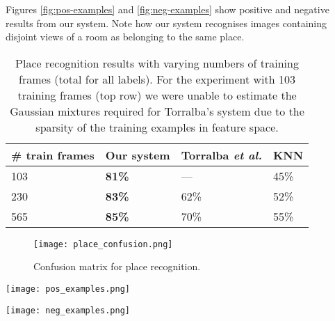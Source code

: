 Figures \ref{fig:pos-examples} and \ref{fig:neg-examples} show
positive and negative results from our system. Note how our system
recognises images containing disjoint views of a room as belonging to
the same place.

\begin{table}[htb]
\centering
\begin{tabular}{ l || l | l | l }
\# train frames & Our system & Torralba {\em et al.} & KNN \\
\hline			
  103 & \textbf{81\%} & --- & 45\% \\
  230 & \textbf{83\%} & 62\% & 52\% \\
  565 & \textbf{85\%} & 70\% & 55\% \\
\end{tabular}
\caption{Place recognition results with varying numbers of training
  frames (total for all labels). For the experiment with 103 training
  frames (top row) we were unable to estimate the Gaussian mixtures
  required for Torralba's system due to the sparsity of the training
  examples in feature space.}
\label{table:place-cla-results}
\end{table}

\begin{figure}[htp]
\centering
\texttt{[image: place\_confusion.png]}
\caption{Confusion matrix for place recognition.}
\label{fig:place-confusion}
\end{figure}

\begin{figure*}[htp]
\centering
\texttt{[image: pos\_examples.png]}
\caption{Example frames for which our classifier succeeded. The ground
  truth label is underlined and the output from our system is
  starred. We show the log likelihoods not the actual posterior
  because the large number of terms in \eqref{lik} causes the
  posterior to always be sharply peaked and hence the log likelihood
  is more informative for visualisation. Note the variation between
  frames with the same label, and the poverty of the information
  contained in many frames.}
\label{fig:pos-examples}
\end{figure*}

\begin{figure*}[htp]
\centering
\texttt{[image: neg\_examples.png]}
\caption{Example frames for which our classifier failed. See caption
  of .}
\label{fig:neg-examples}
\end{figure*}

